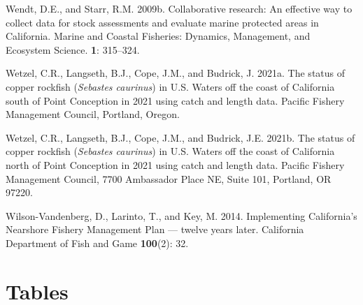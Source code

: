 \documentclass[11pt,
  english,
  letterpaper,
]{article}
\newlength{\cslhangindent}
\newenvironment{CSLReferences}[2] %
 {%
  \setlength{\parindent}{0pt}
  \ifodd #1 \everypar{\setlength{\hangindent}{\cslhangindent}}\ignorespaces\fi
  \ifnum #2 > 0
  \setlength{\parskip}{#2\baselineskip}
  \fi
 }%
 {}
\begin{document}
\begin{CSLReferences}{1}{0}
\leavevmode{}%
Wendt, D.E., and Starr, R.M. 2009b. Collaborative research: An effective way to collect data for stock assessments and evaluate marine protected areas in {California}. Marine and Coastal Fisheries: Dynamics, Management, and Ecosystem Science. \textbf{1}: 315--324.

\leavevmode{}%
Wetzel, C.R., Langseth, B.J., Cope, J.M., and Budrick, J. 2021a. The status of copper rockfish (\emph{{Sebastes} caurinus}) in {U}.{S}. Waters off the coast of {California} south of {Point} {Conception} in 2021 using catch and length data. Pacific Fishery Management Council, Portland, Oregon.

\leavevmode{}%
Wetzel, C.R., Langseth, B.J., Cope, J.M., and Budrick, J.E. 2021b. The status of copper rockfish (\emph{{Sebastes} caurinus}) in {U}.{S}. Waters off the coast of {California} north of {Point} {Conception} in 2021 using catch and length data. Pacific Fishery Management Council, 7700 Ambassador Place NE, Suite 101, Portland, OR 97220.

\leavevmode{}%
Wilson-Vandenberg, D., Larinto, T., and Key, M. 2014. Implementing {California}'s {Nearshore} {Fishery} {Management} {Plan} --- twelve years later. California Department of Fish and Game \textbf{100}(2): 32.

\end{CSLReferences}

\clearpage

\hypertarget{tables}{%
\section{Tables}\label{tables}}

\begingroup\fontsize{10}{12}\selectfont
\begingroup\fontsize{10}{12}\selectfont
\end{document}
